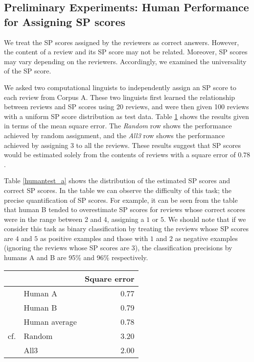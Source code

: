 \documentclass[japanese]{jnlp_1.3d}
\begin{document}
\subsection{Preliminary Experiments: Human Performance for Assigning SP scores}
\label{SP score}
We treat the SP scores assigned by the reviewers as correct answers. However, the content of a review and its SP score may not be related. Moreover, SP scores may vary depending on the reviewers. Accordingly, we examined the universality of the SP score.

We asked two computational linguists to independently assign an SP score to each review from Corpus A. These two linguists first learned the relationship between reviews and SP scores using 20 reviews, and were then given 100 reviews with a uniform SP score distribution as test data. Table \ref{humantest_abssq} shows the results given in terms of the mean square error.  The  \textit{Random}  row shows the performance achieved by random assignment, and the \textit{All3} row shows the performance achieved by assigning $3$ to all the reviews. These results suggest that SP scores would be estimated solely from the contents of reviews with a square error of $0.78$.


Table \ref{humantest_a} shows the distribution of the estimated SP scores and correct SP scores. In the table we can observe the difficulty of this task; the precise quantification of SP scores. For example, it can be seen from the table that human B tended to overestimate SP scores for reviews whose correct scores were in the range between 2 and 4, assigning a $1$ or $5$. We should note that if we consider this task as binary classification by treating the reviews whose SP scores are $4$ and $5$ as positive examples and those with $1$ and $2$ as negative examples (ignoring the reviews whose SP scores are $3$), the classification precisions by humans A and B are 95\% and 96\% respectively.

\begin{table}[t]
	\label{humantest_abssq}
	  \begin{center}
  \begin{tabular}{|ll|r|} \hline
    &        & Square error \\ \hline
    &Human A   & 0.77         \\ 
    &Human B   & 0.79         \\ \hline
    &Human average & 0.78     \\ \hline
cf. &  Random    & 3.20         \\
    & All3      & 2.00         \\ \hline

  \end{tabular}
  \end{center}
\end{table}
\end{document}
